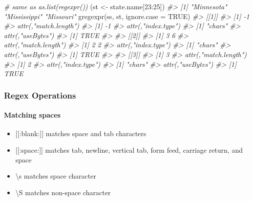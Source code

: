 \documentclass[
]{book}
\newenvironment{Shaded}{\begin{snugshade}}{\end{snugshade}}
\newcommand{\AttributeTok}[1]{\textcolor[rgb]{0.77,0.63,0.00}{#1}}
\newcommand{\CommentTok}[1]{\textcolor[rgb]{0.56,0.35,0.01}{\textit{#1}}}
\newcommand{\ConstantTok}[1]{\textcolor[rgb]{0.00,0.00,0.00}{#1}}
\newcommand{\DecValTok}[1]{\textcolor[rgb]{0.00,0.00,0.81}{#1}}
\newcommand{\FunctionTok}[1]{\textcolor[rgb]{0.00,0.00,0.00}{#1}}
\newcommand{\NormalTok}[1]{#1}
\newcommand{\OtherTok}[1]{\textcolor[rgb]{0.56,0.35,0.01}{#1}}
\newcommand{\SpecialCharTok}[1]{\textcolor[rgb]{0.00,0.00,0.00}{#1}}
\newcommand{\StringTok}[1]{\textcolor[rgb]{0.31,0.60,0.02}{#1}}
\providecommand{\tightlist}{%
  \setlength{\itemsep}{0pt}\setlength{\parskip}{0pt}}
\begin{document}
\begin{Shaded}
\begin{Highlighting}[]
\CommentTok{\# same as as.list(regexpr())}
\NormalTok{(st }\OtherTok{\textless{}{-}}\NormalTok{ state.name[}\DecValTok{23}\SpecialCharTok{:}\DecValTok{25}\NormalTok{])}
\CommentTok{\#\textgreater{} [1] "Minnesota"   "Mississippi" "Missouri"}
\FunctionTok{gregexpr}\NormalTok{(}\StringTok{\textquotesingle{}ss\textquotesingle{}}\NormalTok{, st, }\AttributeTok{ignore.case =} \ConstantTok{TRUE}\NormalTok{)}
\CommentTok{\#\textgreater{} [[1]]}
\CommentTok{\#\textgreater{} [1] {-}1}
\CommentTok{\#\textgreater{} attr(,"match.length")}
\CommentTok{\#\textgreater{} [1] {-}1}
\CommentTok{\#\textgreater{} attr(,"index.type")}
\CommentTok{\#\textgreater{} [1] "chars"}
\CommentTok{\#\textgreater{} attr(,"useBytes")}
\CommentTok{\#\textgreater{} [1] TRUE}
\CommentTok{\#\textgreater{} }
\CommentTok{\#\textgreater{} [[2]]}
\CommentTok{\#\textgreater{} [1] 3 6}
\CommentTok{\#\textgreater{} attr(,"match.length")}
\CommentTok{\#\textgreater{} [1] 2 2}
\CommentTok{\#\textgreater{} attr(,"index.type")}
\CommentTok{\#\textgreater{} [1] "chars"}
\CommentTok{\#\textgreater{} attr(,"useBytes")}
\CommentTok{\#\textgreater{} [1] TRUE}
\CommentTok{\#\textgreater{} }
\CommentTok{\#\textgreater{} [[3]]}
\CommentTok{\#\textgreater{} [1] 3}
\CommentTok{\#\textgreater{} attr(,"match.length")}
\CommentTok{\#\textgreater{} [1] 2}
\CommentTok{\#\textgreater{} attr(,"index.type")}
\CommentTok{\#\textgreater{} [1] "chars"}
\CommentTok{\#\textgreater{} attr(,"useBytes")}
\CommentTok{\#\textgreater{} [1] TRUE}
\end{Highlighting}
\end{Shaded}

\hypertarget{regex-operations}{%
\subsubsection{Regex Operations}\label{regex-operations}}

\hypertarget{matching-spaces}{%
\paragraph{Matching spaces}\label{matching-spaces}}

\begin{itemize}
\tightlist
\item
  {[}{[}:blank:{]}{]} matches space and tab characters
\item
  {[}{[}:space:{]}{]} matches tab, newline, vertical tab, form feed, carriage return, and space
\item
  \textbackslash s matches space character
\item
  \textbackslash S matches non-space character
\end{itemize}
\end{document}
